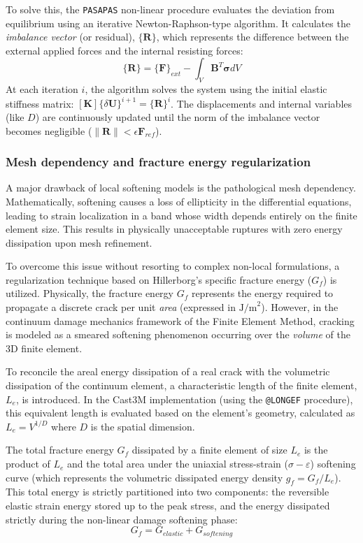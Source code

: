 \documentclass[a4paper,12pt,twoside]{report}     %
\begin{document}
To solve this, the \texttt{PASAPAS} non-linear procedure evaluates the deviation from equilibrium using an iterative Newton-Raphson-type algorithm. It calculates the \textit{imbalance vector} (or residual), $\{\mathbf{R}\}$, which represents the difference between the external applied forces and the internal resisting forces:
\begin{equation}
    \{\mathbf{R}\} = \{\mathbf{F}\}_{ext} - \int_V \mathbf{B}^T \boldsymbol{\sigma} dV
\end{equation}
At each iteration $i$, the algorithm solves the system using the initial elastic stiffness matrix: $[\mathbf{K}]\{\delta\mathbf{U}\}^{i+1} = \{\mathbf{R}\}^i$. The displacements and internal variables (like $D$) are continuously updated until the norm of the imbalance vector becomes negligible ($\|\mathbf{R}\| < \epsilon \mathbf{F}_{ref}$).

\subsubsection{Mesh dependency and fracture energy regularization}
A major drawback of local softening models is the pathological mesh dependency. Mathematically, softening causes a loss of ellipticity in the differential equations, leading to strain localization in a band whose width depends entirely on the finite element size. This results in physically unacceptable ruptures with zero energy dissipation upon mesh refinement.

To overcome this issue without resorting to complex non-local formulations, a regularization technique based on Hillerborg's specific fracture energy ($G_f$) is utilized. Physically, the fracture energy $G_f$ represents the energy required to propagate a discrete crack per unit \textit{area} (expressed in $\text{J/m}^2$). However, in the continuum damage mechanics framework of the Finite Element Method, cracking is modeled as a smeared softening phenomenon occurring over the \textit{volume} of the 3D finite element. 

To reconcile the areal energy dissipation of a real crack with the volumetric dissipation of the continuum element, a characteristic length of the finite element, $L_e$, is introduced. In the Cast3M implementation (using the \texttt{@LONGEF} procedure), this equivalent length is evaluated based on the element's geometry, calculated as $L_e = V^{1/D}$ where $D$ is the spatial dimension. 

The total fracture energy $G_f$ dissipated by a finite element of size $L_e$ is the product of $L_e$ and the total area under the uniaxial stress-strain ($\sigma-\varepsilon$) softening curve (which represents the volumetric dissipated energy density $g_f = G_f / L_e$). This total energy is strictly partitioned into two components: the reversible elastic strain energy stored up to the peak stress, and the energy dissipated strictly during the non-linear damage softening phase:
\begin{equation}
    G_f = G_{elastic} + G_{softening}
\end{equation}
\end{document}
